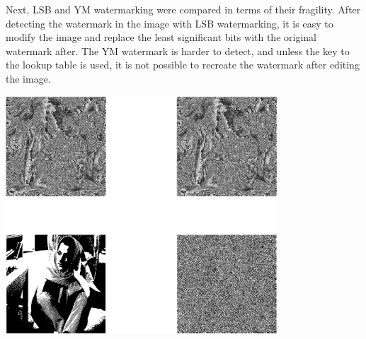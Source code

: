 \documentclass{article}
\begin{document}
Next, LSB and YM watermarking were compared in terms of their fragility.
After detecting the watermark in the image with LSB watermarking, it is
easy to modify the image and replace the least significant bits with the
original watermark after. The YM watermark is harder to detect, and
unless the key to the lookup table is used, it is not possible to
recreate the watermark after editing the image.


\includegraphics [width=4in]{lab3_08.eps}
\end{document}
